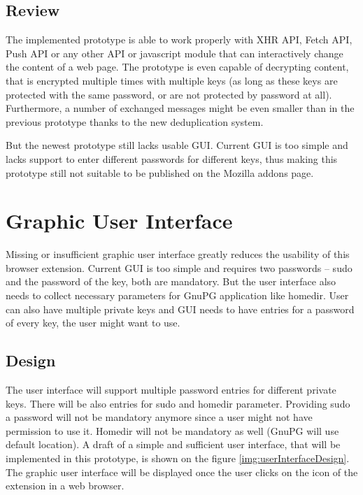 \subsection{Review}
The implemented prototype is able to work properly with XHR API, Fetch API, Push API or any other API or javascript module that can interactively change the content of a web page. The prototype is even capable of decrypting content, that is encrypted multiple times with multiple keys (as long as these keys are protected with the same password, or are not protected by password at all). Furthermore, a number of exchanged messages might be even smaller than in the previous prototype thanks to the new deduplication system.

But the newest prototype still lacks usable GUI. Current GUI is too simple and lacks support to enter different passwords for different keys, thus making this prototype still not suitable to be published on the Mozilla addons page.

\section{Graphic User Interface}
\label{prototype:gui}
Missing or insufficient graphic user interface greatly reduces the usability of this browser extension. Current GUI is too simple and requires two passwords -- sudo and the password of the key, both are mandatory. But the user interface also needs to collect necessary parameters for GnuPG application like homedir. User can also have multiple private keys and GUI needs to have entries for a password of every key, the user might want to use.

\subsection{Design}
The user interface will support multiple password entries for different private keys. There will be also entries for sudo and homedir parameter. Providing sudo a password will not be mandatory anymore since a user might not have permission to use it. Homedir will not be mandatory as well (GnuPG will use default location). A draft of a simple and sufficient user interface, that will be implemented in this prototype, is shown on the figure \ref{img:userInterfaceDesign}. The graphic user interface will be displayed once the user clicks on the icon of the extension in a web browser.

